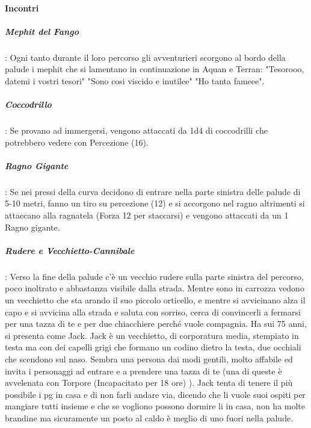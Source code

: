 \documentclass{article}
\begin{document}
\paragraph{Incontri}
\subparagraph{Mephit del Fango}: Ogni tanto durante il loro percorso gli avventurieri scorgono al bordo della palude i mephit che si lamentano in continuazione in Aquan e Terran:  "Tesorooo, datemi i vostri tesori" "Sono cosi viscido e inutilee" "Ho tanta fameee".
\subparagraph{Coccodrillo}: Se provano ad immergersi, vengono attaccati da 1d4 di coccodrilli che potrebbero vedere con Percezione (16).
\subparagraph{Ragno Gigante}: Se nei pressi della curva decidono di entrare nella parte sinistra delle palude di 5-10 metri, fanno un tiro su percezione (12) e si accorgono nel ragno altrimenti si attaccano alla ragnatela (Forza 12 per staccarsi) e vengono attaccati da un 1 Ragno gigante. 
\subparagraph{Rudere e Vecchietto-Cannibale}: Verso la fine della palude c'è un vecchio rudere sulla parte sinistra del percorso, poco inoltrato e abbastanza visibile dalla strada. Mentre sono in carrozza vedono un vecchietto che sta arando il suo piccolo orticello, e mentre si avvicinano alza il capo e si avvicina alla strada e saluta con sorriso, cerca di convincerli a fermarsi per una tazza di te e per due chiacchiere perché vuole compagnia.  Ha sui 75 anni, si presenta come Jack. Jack è un vecchietto, di corporatura media, stempiato in testa ma con dei capelli grigi che formano un codino dietro la testa, due occhiali che scendono sul naso. Sembra una persona dai modi gentili, molto affabile ed invita i personaggi ad entrare e a prendere una tazza di te (una di queste è avvelenata con Torpore (Incapacitato per 18 ore) ). Jack tenta di tenere il più possibile i pg in casa e di non farli andare via, dicendo che li vuole suoi ospiti per mangiare tutti insieme e che se vogliono possono dormire li in casa, non ha molte brandine ma sicuramente un posto al caldo è meglio di uno fuori nella palude.
\end{document}
